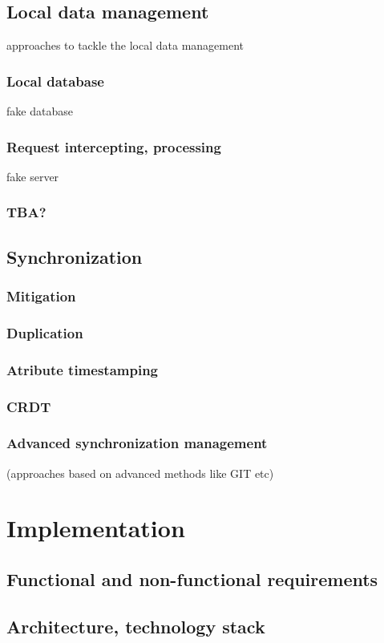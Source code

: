 \documentclass[
  digital,     %
  color,       %
  oneside,     %
  nosansbold,  %
  nocolorbold, %
  lof,         %
  lot,         %
]{fithesis4}
\begin{document}
\section{Local data management}
approaches to tackle the local data management
\subsection{Local database}
fake database
\subsection{Request intercepting, processing}
fake server
\subsection{TBA?}
\section{Synchronization}
\subsection{Mitigation}
\subsection{Duplication}
\subsection{Atribute timestamping}
\subsection{CRDT}
\subsection{Advanced synchronization management}
(approaches based on advanced methods like GIT etc)

\chapter{Implementation}
\section{Functional and non-functional requirements}
\section{Architecture, technology stack}
\end{document}
